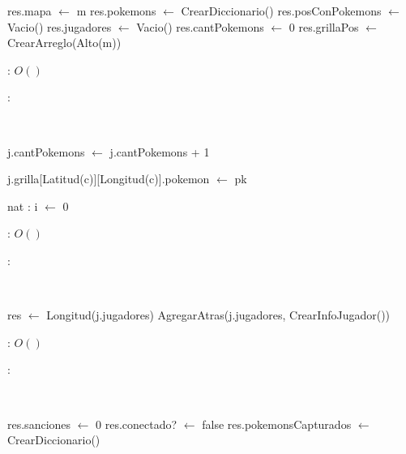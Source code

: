 \begin{Algoritmos}

	\begin{algorithm}[H]
		\NoCaptionOfAlgo
		\caption{}
		res.mapa $\leftarrow$ m\;
		res.pokemons $\leftarrow$ CrearDiccionario()\;
		res.posConPokemons $\leftarrow$ Vacio()\;
		res.jugadores $\leftarrow$ Vacio()\;
		res.cantPokemons $\leftarrow$ 0\;
		res.grillaPos $\leftarrow$ CrearArreglo(Alto(m))\;
	\end{algorithm}

	\complejidad: $O()$

	\justifcomp:

	~

	\begin{algorithm}[H]
		\NoCaptionOfAlgo
		\caption{}
		j.cantPokemons $\leftarrow$ j.cantPokemons + 1\;

		j.grilla[Latitud(c)][Longitud(c)].pokemon $\leftarrow$ pk\;

		nat : i $\leftarrow$ 0\;
	\end{algorithm}

	\complejidad: $O()$

	\justifcomp:

	~

	\begin{algorithm}[H]
		\NoCaptionOfAlgo
		\caption{}
		res $\leftarrow$ Longitud(j.jugadores)\; 
		AgregarAtras(j.jugadores, CrearInfoJugador())\;
	\end{algorithm}

	\complejidad: $O()$

	\justifcomp:

	~

	\begin{algorithm}[H]
		\NoCaptionOfAlgo
		\caption{}
		res.sanciones $\leftarrow$ 0\;
		res.conectado? $\leftarrow$ false\;
		res.pokemonsCapturados $\leftarrow$ CrearDiccionario()\;
	\end{algorithm}


\end{Algoritmos}

